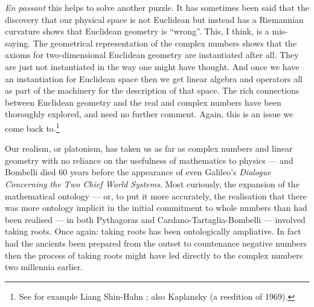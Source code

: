 \documentclass[11pt,oneside,a4paper]{article}
\begin{document}
\textit{En passant} this helps to solve another puzzle. It has sometimes been said that the discovery that our physical space is not Euclidean but instead has a Riemannian curvature shows that Euclidean geometry is ``wrong''. This, I think, is a mis-saying. The geometrical representation of the complex numbers shows that the axioms for two-dimensional Euclidean geometry are instantiated after all. They are just not instantiated in the way one might have thought. And once we have an instantiation for Euclidean space then we get linear algebra and operators all as part of the machinery for the description of that space. The rich connections between Euclidean geometry and the real and complex numbers have been thoroughly explored, and need no further comment. Again, this is an issue we come back to.\footnote{See for example Liang Shin-Hahn \parencite*{hahn_complex_1994}; also Kaplansky \parencite*{kaplansky_linear_2003} (a reedition of 1969).}

Our realism, or platonism, has taken us as far as complex numbers and linear geometry with no reliance on the usefulness of mathematics to physics --- and Bombelli died 60 years before the appearance of even Galileo's \textit{Dialogue Concerning the Two Chief World Systems}. Most curiously, the expansion of the mathematical ontology --- or, to put it more accurately, the realisation that there was more ontology implicit in the initial commitment to whole numbers than had been realised --- in both Pythagoras and Cardano-Tartaglia-Bombelli --- involved taking roots. Once again: taking roots has been ontologically ampliative. In fact had the ancients been prepared from the outset to countenance negative numbers then the process of taking roots might have led directly to the complex numbers two millennia earlier.
\end{document}
